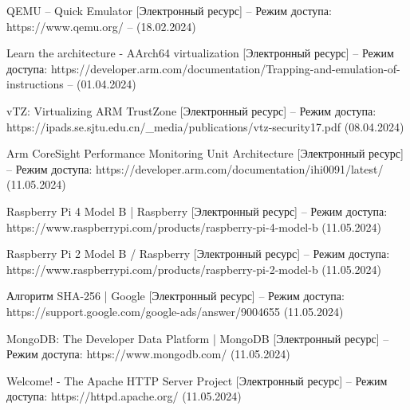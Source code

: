 \begin{thebibliography}{}
QEMU -- Quick Emulator [Электронный ресурс] – Режим доступа: https://www.qemu.org/ – (18.02.2024)

Learn the architecture - AArch64 virtualization [Электронный ресурс] – Режим доступа: https://developer.arm.com/documentation/Trapping-and-emulation-of-instructions – (01.04.2024)

vTZ: Virtualizing ARM TrustZone [Электронный ресурс] – Режим доступа:
https://ipads.se.sjtu.edu.cn/\_media/publications/vtz-security17.pdf (08.04.2024)

Arm CoreSight Performance Monitoring Unit Architecture [Электронный ресурс] – Режим доступа:
https://developer.arm.com/documentation/ihi0091/latest/ (11.05.2024)

Raspberry Pi 4 Model B | Raspberry [Электронный ресурс] – Режим доступа:
https://www.raspberrypi.com/products/raspberry-pi-4-model-b (11.05.2024)

Raspberry Pi 2 Model B / Raspberry [Электронный ресурс] – Режим доступа:
https://www.raspberrypi.com/products/raspberry-pi-2-model-b (11.05.2024)

Алгоритм SHA-256 | Google [Электронный ресурс] – Режим доступа:
https://support.google.com/google-ads/answer/9004655 (11.05.2024)

MongoDB: The Developer Data Platform | MongoDB  [Электронный ресурс] – Режим доступа:
https://www.mongodb.com/ (11.05.2024)

Welcome! - The Apache HTTP Server Project [Электронный ресурс] – Режим доступа:
https://httpd.apache.org/ (11.05.2024)

\end{thebibliography}
\endgroup

\pagebreak